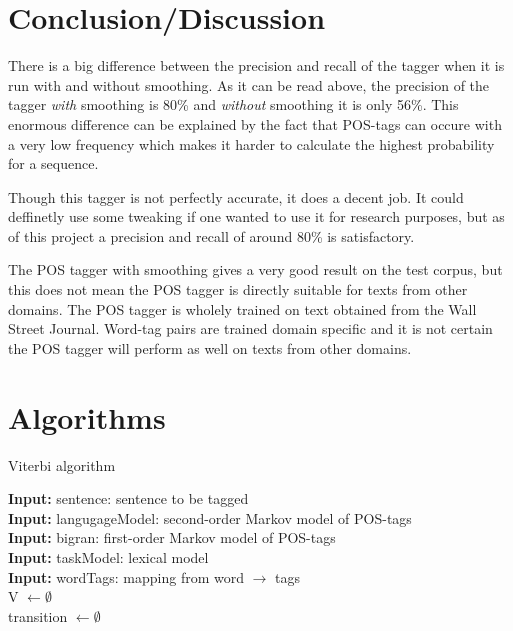 \documentclass[10pt, a4paper]{article}
\begin{document}
\section*{Conclusion/Discussion}
There is a big difference between the precision and recall of the tagger when it is run with and without smoothing. As it can be read above, the precision of the tagger \textit{with} smoothing is 80\% and \textit{without} smoothing it is only 56\%. This enormous difference can be explained by the fact that POS-tags can occure with a very low frequency which makes it harder to calculate the highest probability for a sequence.

Though this tagger is not perfectly accurate, it does a decent job. It could deffinetly use some tweaking if one wanted to use it for research purposes, but as of this project a precision and recall of around 80\% is satisfactory.

The POS tagger with smoothing gives a very good result on the test corpus, but this does not mean the POS tagger is directly suitable for texts from other domains. The POS tagger is wholely trained on text obtained from the Wall Street Journal. Word-tag pairs are trained domain specific and it is not certain the POS tagger will perform as well on texts from other domains.

\newpage
\appendix{}
\section{Algorithms}


\begin{algorithm}[H]
\caption{Viterbi algorithm}
\textbf{Input:} sentence: sentence to be tagged\\
\textbf{Input:} langugageModel: second-order Markov model of POS-tags\\
\textbf{Input:} bigran: first-order Markov model of POS-tags\\
\textbf{Input:} taskModel: lexical model\\
\textbf{Input:} wordTags: mapping from word $\rightarrow$ tags\\
V $\leftarrow \emptyset$\\
transition $\leftarrow \emptyset$\\
\end{algorithm}
\end{document}
